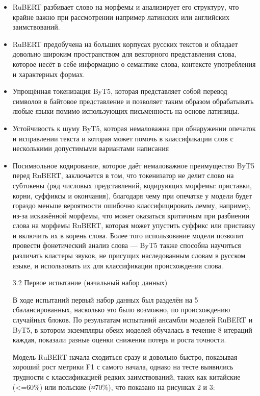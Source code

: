 \begin{itemize}
\item
  RuBERT разбивает слово на морфемы и анализирует его структуру, что крайне важно при рассмотрении например латинских или английских заимствований.
\item
  RuBERT предобучена на больших корпусах русских текстов и обладает довольно широким пространством для векторного представления слова, которое несёт в себе информацию о семантике слова, контексте употребления и характерных формах.
\item
  Упрощённая токенизация ByT5, которая представляет собой перевод символов в байтовое представление и позволяет таким образом обрабатывать любые языки помимо использующих письменность на основе латиницы.
\item
  Устойчивость к шуму ByT5, которая немаловажна при обнаружении опечаток и исправлении текста и которая может помочь в классификации слов с несколькими допустимыми вариантами написания
\item
  Посимвольное кодирование, которое даёт немаловажное преимущество ByT5 перед RuBERT, заключается в том, что токенизатор не делит слово на субтокены (ряд числовых представлений, кодирующих морфемы: приставки, корни, суффиксы и окончания), благодаря чему при опечатке у модели будет гораздо меньше вероятности ошибочно классифицировать лемму, например, из-за искажённой морфемы, что может оказаться критичным при разбиении слова на морфемы RuBERT, которая может упустить суффикс или приставку и включить их в корень слова. Более того использование модели позволит провести фонетический анализ слова --- ByT5 также способна научиться различать кластеры звуков, не присущих наследованным словам в русском языке, и использовать их для классификации происхождения слова.

  3.2 Первое испытание (начальный набор данных)

  В ходе испытаний первый набор данных был разделён на 5 сбалансированных, насколько это было возможно, по происхождению случайных блоков. По результатам испытаний ансамбли моделей RuBERT и ByT5, в котором экземпляры обеих моделей обучалась в течение 8 итераций каждая, показали разные оценки снижения потерь и роста точности.

  Модель RuBERT начала сходиться сразу и довольно быстро, показывая хороший рост метрики F1 с самого начала, однако на тесте выявились трудности с классификацией редких заимствований, таких как китайские (\textless=60\%) или польские (≈70\%), что показано на рисунках 2 и 3:


\end{itemize}
